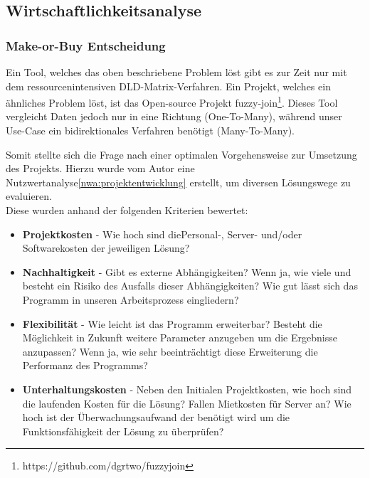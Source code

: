 




\subsection{Wirtschaftlichkeitsanalyse}
\subsubsection{Make-or-Buy Entscheidung}
Ein Tool, welches das oben beschriebene Problem löst gibt es zur Zeit nur mit dem
ressourcenintensiven DLD-Matrix-Verfahren. Ein Projekt, welches ein ähnliches
Problem löst, ist das Open-source Projekt fuzzy-join\footnote{https://github.com/dgrtwo/fuzzyjoin}.
Dieses Tool vergleicht Daten jedoch nur in eine Richtung (One-To-Many), während unser
Use-Case ein bidirektionales Verfahren benötigt (Many-To-Many).\par

Somit stellte sich die Frage nach einer optimalen Vorgehensweise zur Umsetzung des
Projekts. Hierzu wurde vom Autor eine Nutzwertanalyse\ref{nwa:projektentwicklung} erstellt, um diversen Lösungswege zu evaluieren. \\
Diese wurden anhand der folgenden Kriterien bewertet:


\begin{itemize}
    \item \textbf{Projektkosten} - Wie hoch sind diePersonal-, Server- und/oder Softwarekosten der jeweiligen Lösung?

    \item \textbf{Nachhaltigkeit} - Gibt es externe Abhängigkeiten? Wenn ja, wie viele und besteht ein Risiko des Ausfalls dieser Abhängigkeiten? Wie gut lässt sich das Programm in unseren Arbeitsprozess eingliedern? 

    \item \textbf{Flexibilität} - Wie leicht ist das Programm erweiterbar? Besteht die Möglichkeit in Zukunft weitere Parameter anzugeben um die Ergebnisse anzupassen? Wenn ja, wie sehr beeinträchtigt diese Erweiterung die Performanz des Programms?

    \item \textbf{Unterhaltungskosten} - Neben den Initialen Projektkosten, wie hoch sind die laufenden Kosten für die Lösung? Fallen Mietkosten für Server an? Wie hoch ist der Überwachungsaufwand der benötigt wird um die Funktionsfähigkeit der Lösung zu überprüfen?

\end{itemize}



